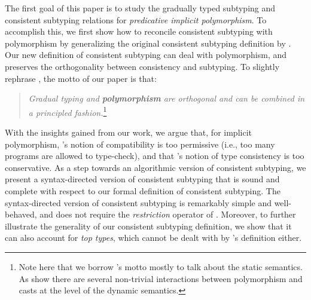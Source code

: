 \begin{comment}
Instead several works use alternative notions such as
\emph{compatibility} of types~\citep{} or adapted versions of type
consistency~\citep{}.
For instance both \citet{ahmed2011blame} (in the
Polymorphic Blame calculus) and \citet{yuu2017poly} define
notions of \emph{compatibility}. \jeremy{inaccurate} These two notions of compatibility
are different from each other, and they are not derived from
consistency and subtyping.
\ningning{Mention however they are trying to mixing subtyping and consistency to some degree?}
\ningning{one advantage of their systems is that they do no guessing}
Thus one first criticism to compatibility is 
that it lacks the orthogonality of notions (subtyping and consistency)
afforded by consistent subtyping~\citep{siek2007gradual}  \bruno{Ningning, has this criticism
  been pointed out by someone else before? If so, who? Citing them
  would strengthen our point}.
\ningning{I think no except Siek}
Moreover, the 
proposals for compatibility are different, which makes it unclear 
of which one is more appropriate.
\end{comment}

The first goal of this paper is to study the gradually typed subtyping
and consistent subtyping relations for \emph{predicative implicit polymorphism}.
To accomplish this, we first show how
to reconcile consistent subtyping with polymorphism by generalizing
the original consistent subtyping definition by
\citeauthor{siek2007gradual}. Our new definition of consistent
subtyping can deal with polymorphism, and preserves the orthogonality
between consistency and subtyping. To slightly rephrase \citeauthor{siek2007gradual},
the motto of our paper is that:

\begin{quote}\emph{Gradual typing and {\bf polymorphism} are orthogonal and can be combined
in a principled fashion.}\footnote{Note here that we borrow \citeauthor{siek2007gradual}'s motto
  mostly to talk about the static semantics. As \citet{ahmed2011blame}
show there are several non-trivial interactions between
polymorphism and casts at the level of the dynamic semantics.}
\end{quote}

\noindent With the insights gained from our work, we argue that, for implicit
polymorphism, \citeauthor{ahmed2011blame}'s notion of compatibility is too
permissive (i.e., too many programs are allowed to type-check), and that
\citeauthor{yuu2017poly}'s notion of type consistency is too conservative. As a
step towards an algorithmic version of consistent subtyping, we present a
syntax-directed version of consistent subtyping that is sound and complete with
respect to our formal definition of consistent subtyping. The syntax-directed
version of consistent subtyping is remarkably simple and well-behaved, and does
not require the \emph{restriction} operator of \citet{siek2007gradual}.
Moreover, to further illustrate the generality of our consistent subtyping
definition, we show that it can also account for \emph{top types}, which cannot
be dealt with by \citeauthor{siek2007gradual}'s definition either.

